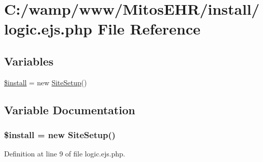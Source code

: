 \hypertarget{logic_8ejs_8php}{\section{\-C\-:/wamp/www/\-Mitos\-E\-H\-R/install/logic.ejs.\-php \-File \-Reference}
\label{logic_8ejs_8php}
}
\subsection*{\-Variables}
\begin{DoxyCompactItemize}
\item 
\hyperlink{logic_8ejs_8php_a889f1cf6d0d69093e28e3e02309d02ac}{\$install} = new \hyperlink{class_site_setup}{\-Site\-Setup}()
\end{DoxyCompactItemize}


\subsection{\-Variable \-Documentation}
\hypertarget{logic_8ejs_8php_a889f1cf6d0d69093e28e3e02309d02ac}{
\subsubsection[{\$install}]{\setlength{\rightskip}{0pt plus 5cm}\$install = new {\bf \-Site\-Setup}()}}\label{logic_8ejs_8php_a889f1cf6d0d69093e28e3e02309d02ac}


\-Definition at line 9 of file logic.\-ejs.\-php.

